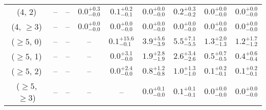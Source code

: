 \begin{table}[h!]
{\begin{tabular}{ccccccccc}
	(4, 2) & -- & -- & $0.0^{+ 0.3 }_{- 0.0 }$ & $0.1^{+ 0.2 }_{- 0.1 }$ & $0.0^{+ 0.0 }_{- 0.0 }$ & $0.2^{+ 0.3 }_{- 0.2 }$ & $0.0^{+ 0.0 }_{- 0.0 }$ & $0.0^{+ 0.0 }_{- 0.0 }$ \\[0.5ex] 
	(4, $\ge3$) & -- & -- & $0.0^{+ 0.0 }_{- 0.0 }$ & $0.0^{+ 0.0 }_{- 0.0 }$ & $0.0^{+ 0.0 }_{- 0.0 }$ & $0.0^{+ 0.0 }_{- 0.0 }$ & $0.0^{+ 0.0 }_{- 0.0 }$ & $0.0^{+ 0.0 }_{- 0.0 }$ \\[0.5ex] 
	($\ge5$, 0) & -- & -- & -- & $0.1^{+ 15.6 }_{- 0.1 }$ & $3.9^{+ 5.6 }_{- 3.9 }$ & $5.5^{+ 7.1 }_{- 5.5 }$ & $1.3^{+ 2.0 }_{- 1.3 }$ & $1.2^{+ 1.7 }_{- 1.2 }$ \\[0.5ex] 
	($\ge5$, 1) & -- & -- & -- & $0.0^{+ 3.1 }_{- 0.0 }$ & $1.9^{+ 2.8 }_{- 1.9 }$ & $2.6^{+ 3.4 }_{- 2.6 }$ & $0.5^{+ 0.7 }_{- 0.5 }$ & $0.4^{+ 0.6 }_{- 0.4 }$ \\[0.5ex] 
	($\ge5$, 2) & -- & -- & -- & $0.0^{+ 2.4 }_{- 0.0 }$ & $0.8^{+ 1.2 }_{- 0.8 }$ & $1.0^{+ 1.3 }_{- 1.0 }$ & $0.1^{+ 0.2 }_{- 0.1 }$ & $0.1^{+ 0.2 }_{- 0.1 }$ \\[0.5ex] 
	($\ge5$, $\ge3$) & -- & -- & -- & -- & $0.0^{+ 0.1 }_{- 0.0 }$ & $0.1^{+ 0.1 }_{- 0.1 }$ & $0.0^{+ 0.0 }_{- 0.0 }$ & $0.0^{+ 0.0 }_{- 0.0 }$ \\[0.5ex] 
	\hline
	\hline
\end{tabular}}
\end{table}
